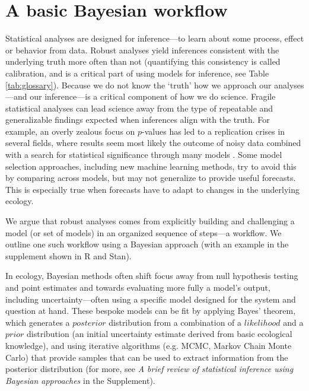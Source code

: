 \documentclass[11pt]{article}
\begin{document}
\section*{A basic Bayesian workflow}
Statistical analyses are designed for inference---to learn about some process, effect or behavior from data. Robust analyses yield inferences consistent with the underlying truth more often than not (quantifying this consistency is called calibration, and is a critical part of using models for inference, see Table \ref{tab:glossary}). Because we do not know the `truth' how we approach our analyses---and our inference---is a critical component of how we do science. Fragile statistical analyses can lead science away from the type of repeatable and generalizable findings expected when inferences align with the truth. For example, an overly zealous focus on $p$-values has led to a replication crises in several fields, where results seem most likely the outcome of noisy data combined with a search for statistical significance through many models \citep[effectively a garden of forking paths,][]{halsey2015,loken2017}. Some model selection approaches, including new machine learning methods, try to avoid this by comparing across models, but may not generalize to provide useful forecasts.  This is especially true when forecasts have to adapt to changes in the underlying ecology.

We argue that robust analyses comes from explicitly building and challenging a model (or set of models) in an organized sequence of steps---a workflow. We outline one such workflow using a Bayesian approach (with an example in the supplement shown in \textsf{R} and \textsf{Stan}). 

In ecology, Bayesian methods often shift focus away from null hypothesis testing and point estimates and towards evaluating more fully a model's output, including uncertainty---often using a specific model designed for the system and question at hand. These bespoke models can be fit by applying Bayes' theorem, which generates a $posterior$ distribution from a combination of a $likelihood$ and a $prior$ distribution (an initial uncertainty estimate derived from basic ecological knowledge), and using iterative algorithms (e.g. MCMC, Markov Chain Monte Carlo) that provide samples that can be used to extract information from the posterior distribution (for more, see \emph{A brief review of statistical inference using Bayesian approaches} in the Supplement).
\end{document}

